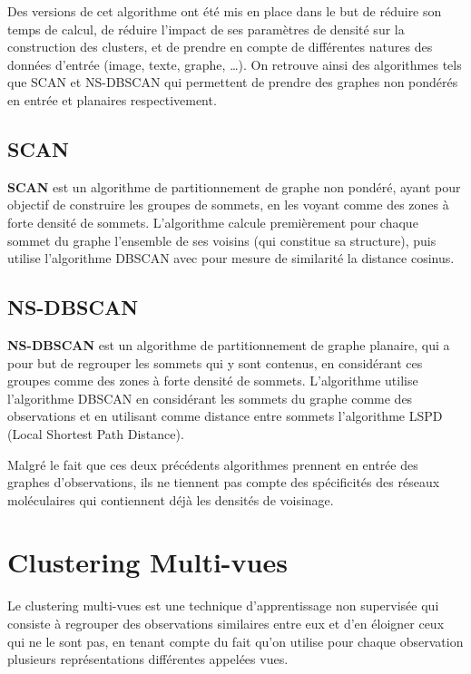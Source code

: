   		  Des versions \cite{bhattacharjee2021survey} de cet algorithme ont été mis en place dans le but de réduire son temps de calcul, de réduire l'impact de ses paramètres de densité sur la construction des clusters, et de prendre en compte de différentes natures des données d'entrée (image, texte, graphe, \dots).
  		  On retrouve ainsi des algorithmes tels que SCAN et NS-DBSCAN qui permettent de prendre des graphes non pondérés en entrée et planaires respectivement.
     	 
  	  \subsection{\acrfull{SCAN}}
      
  		  \textbf{SCAN} %
          \cite{shiokawa2018scalescan} est un algorithme de partitionnement de graphe non pondéré, ayant pour objectif de construire les groupes de sommets, en les voyant comme des zones à forte densité de sommets.
  		  L'algorithme calcule premièrement pour chaque sommet du graphe l'ensemble de ses voisins (qui constitue sa structure), puis utilise l'algorithme DBSCAN avec pour mesure de similarité la distance cosinus.
  	 
  	  \subsection{\acrfull{NS-DBSCAN}}
    
  		  \textbf{NS-DBSCAN} \cite{wang2019ns} est un algorithme de partitionnement de graphe planaire, qui a pour but de regrouper les sommets qui y sont contenus, en considérant ces groupes comme des zones à forte densité de sommets.
  		  L'algorithme utilise l'algorithme DBSCAN en considérant les sommets du graphe comme des observations et en utilisant comme distance entre sommets l'algorithme LSPD \cite{wang2019ns} (Local Shortest Path Distance).
    
  		  Malgré le fait que ces deux précédents algorithmes prennent en entrée des graphes d'observations, ils ne tiennent pas compte des spécificités des réseaux moléculaires qui contiennent déjà les densités de voisinage.

	\section{Clustering Multi-vues}

	Le clustering multi-vues est une technique d'apprentissage non supervisée qui consiste à regrouper des observations similaires entre eux et d'en éloigner ceux qui ne le sont pas, en tenant compte du fait qu'on utilise pour chaque observation plusieurs représentations différentes appelées vues.
    
